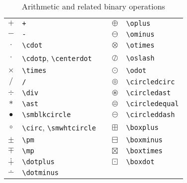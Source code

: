 \documentclass[captions=tableheading]{scrartcl}
\begin{document}
\begin{table}
  \caption{Arithmetic and related binary operations}
  \label{tab:arithmetic-and-related}
  \centering
  \begin{tabular}[c]{clp{1pt}cl}
    \toprule
    $+$ & \verb|+| & & $\oplus$ & \verb|\oplus| \\
    $-$ & \verb|-| & & $\ominus$ & \verb|\ominus| \\
    $\cdot$ & \verb|\cdot| & & $\otimes$ & \verb|\otimes| \\
    $\cdotp$ & \verb|\cdotp|, \verb|\centerdot| & &
    $\oslash$ & \verb|\oslash| \\
    $\times$ & \verb|\times| & & $\odot$ & \verb|\odot| \\
    $/$ & \verb|/| & & $\circledcirc$ & \verb|\circledcirc| \\
    $\div$ & \verb|\div| & & $\circledast$ & \verb|\circledast| \\
    $\ast$ & \verb|\ast| & & $\circledequal$ & \verb|\circledequal| \\
    $\smblkcircle$ & \verb|\smblkcircle| & &
    $\circleddash$ & \verb|\circleddash| \\
    $\circ$ & \verb|\circ|, \verb|\smwhtcircle| & &
    $\boxplus$ & \verb|\boxplus| \\
    $\pm$ & \verb|\pm| & & $\boxminus$ & \verb|\boxminus| \\
    $\mp$ & \verb|\mp| & & $\boxtimes$ & \verb|\boxtimes| \\
    $\dotplus$ & \verb|\dotplus| & & $\boxdot$ & \verb|\boxdot| \\
    $\dotminus$ & \verb|\dotminus| & & & \\
    \bottomrule
  \end{tabular}
\end{table}
\end{document}
